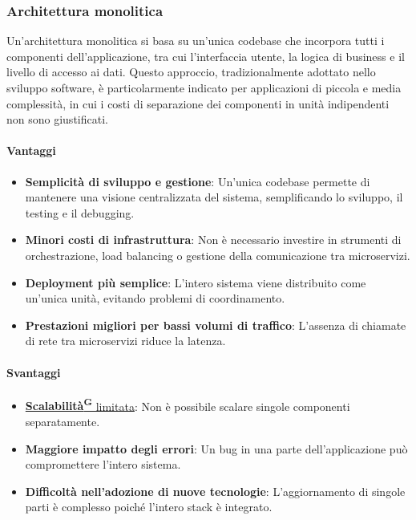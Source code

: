 \subsubsection{Architettura monolitica}
Un’architettura monolitica si basa su un’unica codebase che incorpora tutti i componenti dell’applicazione, tra cui l’interfaccia utente, la logica di business e il livello di accesso ai dati. Questo approccio, tradizionalmente adottato nello sviluppo software, è particolarmente indicato per applicazioni di piccola e media complessità, in cui i costi di separazione dei componenti in unità indipendenti non sono giustificati.
\paragraph{Vantaggi}  
\begin{itemize}
    \item \textbf{Semplicità di sviluppo e gestione}: Un’unica codebase permette di mantenere una visione centralizzata del sistema, semplificando lo sviluppo, il testing e il debugging.
    \item \textbf{Minori costi di infrastruttura}: Non è necessario investire in strumenti di orchestrazione, load balancing o gestione della comunicazione tra microservizi.
    \item \textbf{Deployment più semplice}: L’intero sistema viene distribuito come un’unica unità, evitando problemi di coordinamento.
    \item \textbf{Prestazioni migliori per bassi volumi di traffico}: L’assenza di chiamate di rete tra microservizi riduce la latenza.
\end{itemize}
\paragraph{Svantaggi}  
\begin{itemize}
    \item \href{https://code7crusaders.github.io/docs/PB/documentazione_interna/glossario.html#scalabilità}{\textbf{Scalabilità\textsuperscript{G}} limitata}: Non è possibile scalare singole componenti separatamente.
    \item \textbf{Maggiore impatto degli errori}: Un bug in una parte dell’applicazione può compromettere l’intero sistema.
    \item \textbf{Difficoltà nell’adozione di nuove tecnologie}: L’aggiornamento di singole parti è complesso poiché l’intero stack è integrato.
\end{itemize}

